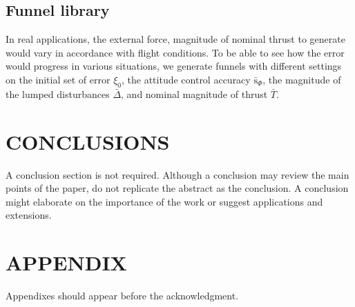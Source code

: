 \documentclass[letterpaper, 10 pt, conference]{ieeeconf}  %
\begin{document}
\subsection{Funnel library}
In real applications, the external force, magnitude of nominal thrust to generate would vary in accordance with flight conditions.
To be able to see how the error would progress in various situations, 
we generate funnels with different settings on the initial set of error $\xi_0$, the attitude control accuracy $\bar{\text{s}}_\Phi$, 
the magnitude of the lumped disturbances $\bar{\Delta}$, and nominal magnitude of thrust $\bar{T}$.







\section{CONCLUSIONS}

A conclusion section is not required. Although a conclusion may review the main points of the paper, do not replicate the abstract as the conclusion. A conclusion might elaborate on the importance of the work or suggest applications and extensions. 

\addtolength{\textheight}{-12cm}   %







\section*{APPENDIX}

Appendixes should appear before the acknowledgment.
\end{document}
